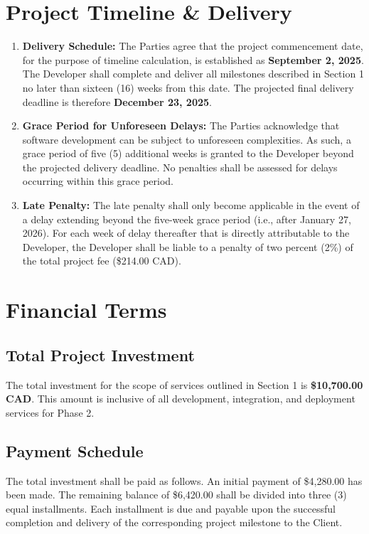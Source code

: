 \documentclass[11pt, a4paper]{article}
\begin{document}
\section{Project Timeline \& Delivery}
\begin{enumerate}
    \item \textbf{Delivery Schedule:} The Parties agree that the project commencement date, for the purpose of timeline calculation, is established as \textbf{September 2, 2025}. The Developer shall complete and deliver all milestones described in Section 1 no later than sixteen (16) weeks from this date. The projected final delivery deadline is therefore \textbf{December 23, 2025}.

    \item \textbf{Grace Period for Unforeseen Delays:} The Parties acknowledge that software development can be subject to unforeseen complexities. As such, a grace period of five (5) additional weeks is granted to the Developer beyond the projected delivery deadline. No penalties shall be assessed for delays occurring within this grace period.

    \item \textbf{Late Penalty:} The late penalty shall only become applicable in the event of a delay extending beyond the five-week grace period (i.e., after January 27, 2026). For each week of delay thereafter that is directly attributable to the Developer, the Developer shall be liable to a penalty of two percent (2\%) of the total project fee (\$214.00 CAD).
\end{enumerate}


\section{Financial Terms}
\subsection{Total Project Investment}
The total investment for the scope of services outlined in Section 1 is \textbf{\$10,700.00 CAD}. This amount is inclusive of all development, integration, and deployment services for Phase 2.

\subsection{Payment Schedule}
The total investment shall be paid as follows. An initial payment of \$4,280.00 has been made. The remaining balance of \$6,420.00 shall be divided into three (3) equal installments. Each installment is due and payable upon the successful completion and delivery of the corresponding project milestone to the Client.
\end{document}
